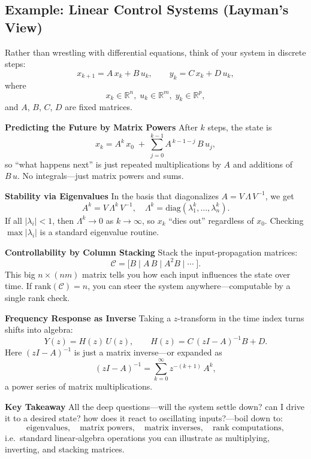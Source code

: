 \subsection{Example: Linear Control Systems (Layman’s View)}  
Rather than wrestling with differential equations, think of your system in discrete steps:
\[
x_{k+1} = A\,x_k + B\,u_k,
\qquad
y_k = C\,x_k + D\,u_k,
\]
where
\[
x_k\in\mathbb{R}^n,\;
u_k\in\mathbb{R}^m,\;
y_k\in\mathbb{R}^p,
\]
and \(A\), \(B\), \(C\), \(D\) are fixed matrices.  

\medskip

\noindent\textbf{Predicting the Future by Matrix Powers}  
After \(k\) steps, the state is
\[
x_k
= A^k\,x_0
\;+\;\sum_{j=0}^{k-1}A^{\,k-1-j}\,B\,u_j,
\]
so “what happens next” is just repeated multiplications by \(A\) and additions of \(B\,u\).  No integrals—just matrix powers and sums.

\medskip

\noindent\textbf{Stability via Eigenvalues}  
In the basis that diagonalizes \(A = V\,\Lambda\,V^{-1}\), we get
\[
A^k = V\,\Lambda^k\,V^{-1},
\quad
\Lambda^k = \mathrm{diag}(\lambda_1^k,\dots,\lambda_n^k).
\]
If all \(|\lambda_i|<1\), then \(\Lambda^k\to0\) as \(k\to\infty\), so \(x_k\) “dies out” regardless of \(x_0\).  Checking \(\max|\lambda_i|\) is a standard eigenvalue routine.

\medskip

\noindent\textbf{Controllability by Column Stacking}  
Stack the input‐propagation matrices:
\[
\mathcal C
= \bigl[B \;\big|\; A\,B \;\big|\; A^2B \;\big|\;\cdots\;\bigr].
\]
This big \(n\times(nm)\) matrix tells you how each input influences the state over time.  If \(\mathrm{rank}(\mathcal C)=n\), you can steer the system anywhere—computable by a single rank check.

\medskip

\noindent\textbf{Frequency Response as Inverse}  
Taking a \(z\)-transform in the time index turns shifts into algebra:
\[
Y(z) = H(z)\,U(z),
\qquad
H(z) = C\,(zI - A)^{-1}B + D.
\]
Here \((zI - A)^{-1}\) is just a matrix inverse—or expanded as
\[
(zI - A)^{-1}
= \sum_{k=0}^\infty z^{-(k+1)}\,A^k,
\]
a power series of matrix multiplications.

\medskip

\noindent\textbf{Key Takeaway}  
All the deep questions—will the system settle down? can I drive it to a desired state? how does it react to oscillating inputs?—boil down to:
\[
\text{eigenvalues},\quad
\text{matrix powers},\quad
\text{matrix inverses},\quad
\text{rank computations},
\]
i.e.\ standard linear‐algebra operations you can illustrate as multiplying, inverting, and stacking matrices.  
















